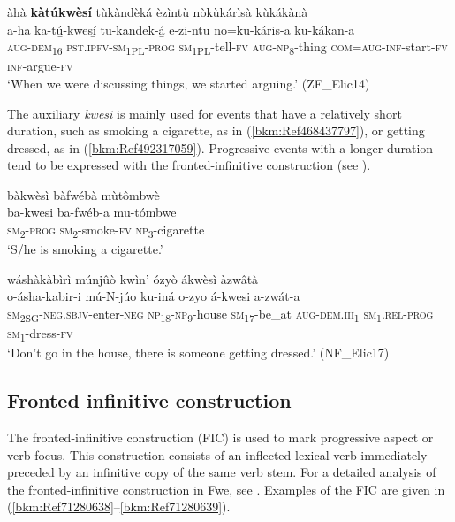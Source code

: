 \ea
\label{bkm:Ref99095463}
àhà \textbf{kàtúkwèsí} tùkàndèká èzìntù nòkùkárìsà kùkákànà\\
\gll a-ha    ka-tú̲-kwesí̲    tu-kandek-á̲  e-zi-ntu no=ku-káris-a    ku-kákan-a\\
\textsc{aug}-\textsc{dem}\textsubscript{16}  \textsc{pst}.\textsc{ipfv}-\textsc{sm}\textsubscript{1PL}-\textsc{prog}  \textsc{sm}\textsubscript{1PL}-tell-\textsc{fv}  \textsc{aug}-\textsc{np}\textsubscript{8}-thing
\textsc{com}=\textsc{aug}-\textsc{inf}-start-\textsc{fv}  \textsc{inf}-argue-\textsc{fv}\\
\glt ‘When we were discussing things, we started arguing.’ (ZF\_Elic14)
\z

The auxiliary \textit{kwesi} is mainly used for events that have a relatively short duration, such as smoking a cigarette, as in (\ref{bkm:Ref468437797}), or getting dressed, as in (\ref{bkm:Ref492317059}). Progressive events with a longer duration tend to be expressed with the fronted-infinitive construction (see ).

\ea
\label{bkm:Ref468437797}
bàkwèsì bàfwébà mùtômbwè\\
\gll ba-kwesi  ba-fwé̲b-a    mu-tómbwe\\
\textsc{sm}\textsubscript{2}-\textsc{prog}  \textsc{sm}\textsubscript{2}-smoke-\textsc{fv}  \textsc{np}\textsubscript{3}-cigarette\\
\glt ‘S/he is smoking a cigarette.’
\z

\ea
\label{bkm:Ref492317059}
wáshàkàbìrì múnjûò kwìn’ ózyò ákwèsì àzwâtà\\
\gll o-ásha-kabir-i      mú-N-júo ku-iná  o-zyo    á̲-kwesi    a-zwá̲t-a \\
\textsc{sm}\textsubscript{2SG}-\textsc{neg}.\textsc{sbjv}-enter-\textsc{neg}  \textsc{np}\textsubscript{18}-\textsc{np}\textsubscript{9}-house
\textsc{sm}\textsubscript{17}-be\_at  \textsc{aug}-\textsc{dem}.\textsc{iii}\textsubscript{1}  \textsc{sm}\textsubscript{1}.\textsc{rel}-\textsc{prog}  \textsc{sm}\textsubscript{1}-dress-\textsc{fv}\\
\glt ‘Don’t go in the house, there is someone getting dressed.’ (NF\_Elic17)
\z
\subsection{Fronted infinitive construction}
\label{bkm:Ref492314081}\hypertarget{Toc75352692}{}\label{bkm:Ref71533571}\label{bkm:Ref492317075}
The fronted-infinitive construction (FIC) is used to mark progressive aspect or verb focus. This construction consists of an inflected lexical verb immediately preceded by an infinitive copy of the same verb stem. For a detailed analysis of the fronted-infinitive construction in Fwe, see {\citet{Gunnink2019}}. Examples of the FIC are given in (\ref{bkm:Ref71280638}--\ref{bkm:Ref71280639}).

